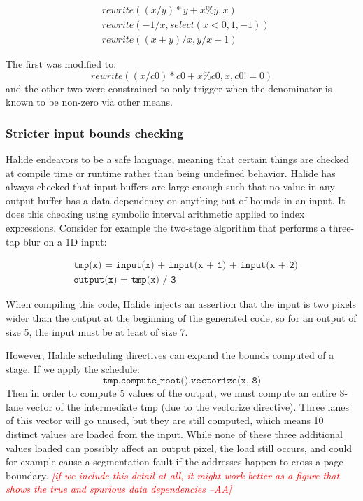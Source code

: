 \documentclass[acmsmall,review,anonymous]{acmart}\settopmatter{printfolios=true,printccs=false,printacmref=false}
\newcommand{\aba}[1]{\textcolor{red}{\textit{[{#1} --AA]}}}
\begin{document}
\begin{align*}
& rewrite((x/y)*y + x\%y, x) \\
& rewrite(-1 / x, select(x < 0, 1, -1)) \\
& rewrite((x + y)/x, y/x + 1)
\end{align*}

The first was modified to:
\[
rewrite((x/c0)*c0 + x\%c0, x, c0 != 0)
\]
and the other two were constrained to only trigger when the denominator is known to be non-zero via other means.

\subsubsection{Stricter input bounds checking}

Halide endeavors to be a safe language, meaning that certain things are checked at compile time or runtime rather than being undefined behavior. Halide has always checked that input buffers are large enough such that no value in any output buffer has a data dependency on anything out-of-bounds in an input. It does this checking using symbolic interval arithmetic applied to index expressions. Consider for example the two-stage algorithm that performs a three-tap blur on a 1D input:

\begin{align*}
& \texttt{tmp(x) = input(x) + input(x + 1) + input(x + 2)} \\
& \texttt{output(x) = tmp(x) / 3}
\end{align*}

When compiling this code, Halide injects an assertion that the input is two pixels wider than the output at the beginning of the generated code, so for an output of size 5, the input must be at least of size 7. 


However, Halide scheduling directives can expand the bounds computed of a stage. If we apply the schedule:
\[
\texttt{tmp.compute_root().vectorize(x, 8)}
\]
Then in order to compute 5 values of the output, we must compute an entire 8-lane vector of the intermediate tmp (due to the vectorize directive). Three lanes of this vector will go unused, but they are still computed, which means 10 distinct values are loaded from the input. While none of these three additional values loaded can possibly affect an output pixel, the load still occurs, and could for example cause a segmentation fault if the addresses happen to cross a page boundary. \aba{if we include this detail at all, it might work better as a figure that shows the true and spurious data dependencies}
\end{document}
